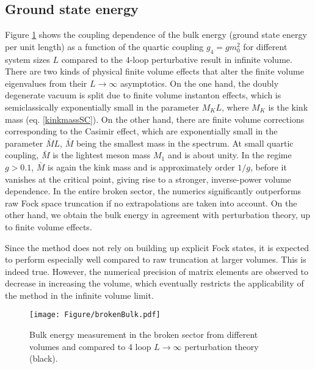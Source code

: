 \documentclass[twocolumn,secnumarabic,amssymb, nobibnotes, aps, prd]{revtex4-2}
\begin{document}
\subsection{Ground state energy}
Figure \ref{FigBrokenBulk} shows the coupling dependence of the bulk energy (ground state energy per unit length) as a function of the quartic coupling $g_4=g m_0^2$ for different system sizes $L$ compared to the $4$-loop perturbative result in infinite volume.
There are two kinds of physical finite volume effects that alter the finite volume eigenvalues from their $L\rightarrow\infty$ asymptotics. On the one hand, the doubly degenerate vacuum is split due to finite volume instanton effects, which is semiclassically exponentially small in the parameter $M_{K}L$, where $M_K$ is the kink mass (eq. \eqref{kinkmassSC}). On the other hand, there are finite volume corrections corresponding to the Casimir effect, which are exponentially small in the parameter $\bar{M}L$, $\bar{M}$ being the smallest mass in the spectrum. At small quartic coupling, $\bar{M}$ is the lightest meson mass $M_1$ and is about unity. In the regime $g>0.1$, $\bar{M}$ is again the kink mass and is approximately order $1/g$, before it vanishes at the critical point, giving rise to a stronger, inverse-power volume dependence. In the entire broken sector, the numerics significantly outperforms raw Fock space truncation if no extrapolations are taken into account. On the other hand, we obtain the bulk energy in agreement with perturbation theory, up to finite volume effects. 

Since the method does not rely on building up explicit Fock states, it is expected to perform especially well compared to raw truncation at larger volumes. This is indeed true. However, the numerical precision of matrix elements are observed to decrease in increasing the volume, which eventually restricts the applicability of the method in the infinite volume limit.

\begin{figure}
\centering
\texttt{[image: Figure/brokenBulk.pdf]}
\caption{Bulk energy measurement in the broken sector from different volumes and compared to 4 loop $L\rightarrow\infty$ perturbation theory (black).}
\label{FigBrokenBulk}
\end{figure}
\end{document}
